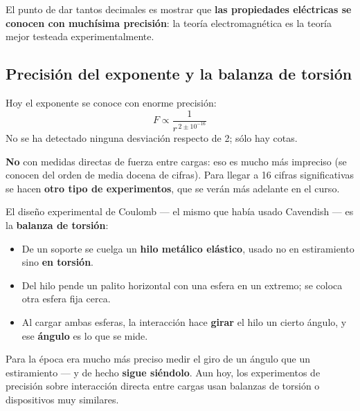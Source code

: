 \documentclass[12pt,a4paper]{article}
\begin{document}
\begin{warnbox}
El punto de dar tantos decimales es mostrar que \textbf{las propiedades eléctricas
se conocen con muchísima precisión}: la teoría electromagnética es la teoría mejor
testeada experimentalmente.
\end{warnbox}

\subsection{Precisión del exponente y la balanza de torsión}

Hoy el exponente se conoce con enorme precisión:
\[
\boxed{\ F \propto \frac{1}{r^{\,2 \pm 10^{-16}}}\ }
\]
No se ha detectado ninguna desviación respecto de 2; sólo hay cotas.

\begin{notebox}
\textbf{No} con medidas directas de fuerza entre cargas: eso es mucho más
impreciso (se conocen del orden de media docena de cifras). Para llegar a 16
cifras significativas se hacen \textbf{otro tipo de experimentos}, que se verán
más adelante en el curso.
\end{notebox}

El diseño experimental de Coulomb --- el mismo que había usado Cavendish --- es la
\textbf{balanza de torsión}:

\begin{itemize}
  \item De un soporte se cuelga un \textbf{hilo metálico elástico}, usado no en
        estiramiento sino \textbf{en torsión}.
  \item Del hilo pende un palito horizontal con una esfera en un extremo; se
        coloca otra esfera fija cerca.
  \item Al cargar ambas esferas, la interacción hace \textbf{girar} el hilo un
        cierto ángulo, y ese \textbf{ángulo} es lo que se mide.
\end{itemize}



\begin{notebox}
Para la época era mucho más preciso medir el giro de un ángulo que un
estiramiento --- y de hecho \textbf{sigue siéndolo}. Aun hoy, los experimentos de
precisión sobre interacción directa entre cargas usan balanzas de torsión o
dispositivos muy similares.
\end{notebox}
\end{document}
